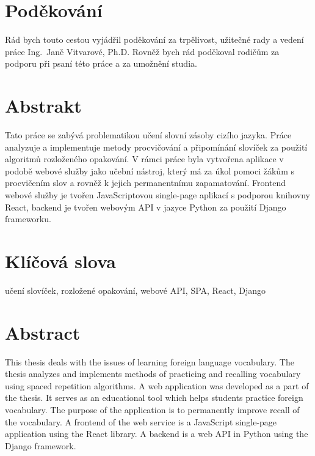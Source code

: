 \documentclass[a4paper,11pt,titlepage,fleqn]{article}
\begin{document}



\setcounter{page}{5}

\newpage
\thispagestyle{plain}
\section*{Poděkování}
Rád bych touto cestou vyjádřil poděkování za trpělivost, užitečné rady a vedení práce Ing.~Janě Vitvarové, Ph.D. Rovněž bych rád poděkoval rodičům za podporu při psaní této práce a za umožnění studia.
\thispagestyle{empty}

\newpage
\thispagestyle{plain}
\section*{Abstrakt}
Tato práce se zabývá problematikou učení slovní zásoby cizího jazyka. Práce analyzuje a implementuje metody procvičování a připomínání slovíček za použití algoritmů rozloženého opakování. V rámci práce byla vytvořena aplikace v podobě webové služby jako učební nástroj, který má za úkol pomoci žákům s procvičením slov a rovněž k jejich permanentnímu zapamatování. 
Frontend webové služby je tvořen JavaScriptovou single-page aplikací s podporou knihovny React, backend je tvořen webovým API v jazyce Python za použití Django frameworku.


\section*{Klíčová slova}
učení slovíček, rozložené opakování, webové API, SPA, React, Django

\section*{Abstract}
This thesis deals with the issues of learning foreign language vocabulary. The thesis analyzes and implements methods of practicing and recalling vocabulary using spaced repetition algorithms. A web application was developed as a part of the thesis. It serves as an educational tool which helps students practice foreign vocabulary. The purpose of the application is to permanently improve recall of the vocabulary. A frontend of the web service is a JavaScript single-page application using the React library. A backend is a web API in Python using the Django framework. 
\end{document}
